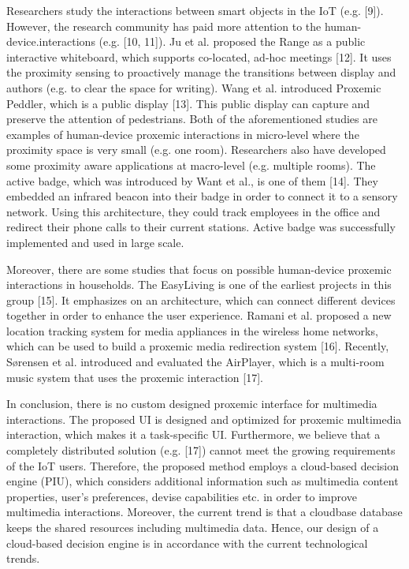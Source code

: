 \documentclass[runningheads,a4paper]{llncs}
\begin{document}
Researchers study the interactions between smart objects in the IoT (e.g. [9]). However, the research community has paid more attention to the human-device.interactions (e.g. [10, 11]). Ju et al. proposed the Range as a public interactive
whiteboard, which supports co-located, ad-hoc meetings [12]. It uses the proximity sensing to proactively manage the transitions between display and authors
(e.g. to clear the space for writing). Wang et al. introduced Proxemic Peddler,
which is a public display [13]. This public display can capture and preserve the
attention of pedestrians. Both of the aforementioned studies are examples of
human-device proxemic interactions in micro-level where the proximity space
is very small (e.g. one room). Researchers also have developed some proximity
aware applications at macro-level (e.g. multiple rooms). The active badge, which
was introduced by Want et al., is one of them [14]. They embedded an infrared
beacon into their badge in order to connect it to a sensory network. Using this
architecture, they could track employees in the office and redirect their phone
calls to their current stations. Active badge was successfully implemented and
used in large scale.



Moreover, there are some studies that focus on possible human-device proxemic interactions in households. The EasyLiving is one of the earliest projects
in this group [15]. It emphasizes on an architecture, which can connect different
devices together in order to enhance the user experience. Ramani et al. proposed
a new location tracking system for media appliances in the wireless home networks, which can be used to build a proxemic media redirection system [16].
Recently, Sørensen et al. introduced and evaluated the AirPlayer, which is a
multi-room music system that uses the proxemic interaction [17].



In conclusion, there is no custom designed proxemic interface for multimedia
interactions. The proposed UI is designed and optimized for proxemic multimedia interaction, which makes it a task-specific UI. Furthermore, we believe that
a completely distributed solution (e.g. [17]) cannot meet the growing requirements of the IoT users. Therefore, the proposed method employs a cloud-based
decision engine (PIU), which considers additional information such as multimedia content properties, user’s preferences, devise capabilities etc. in order to
improve multimedia interactions. Moreover, the current trend is that a cloudbase database keeps the shared resources including multimedia data. Hence, our
design of a cloud-based decision engine is in accordance with the current technological trends.
\end{document}
